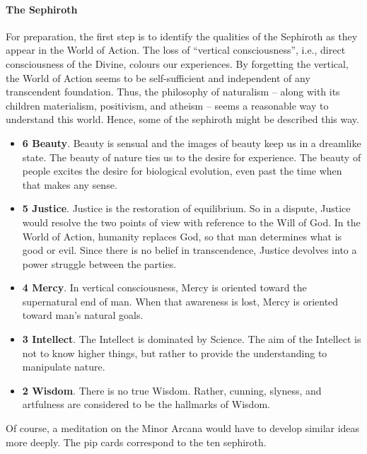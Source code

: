 \paragraph{The Sephiroth}


For preparation, the first step is to identify the qualities of the Sephiroth as they appear in the World of Action. The loss of ``vertical consciousness'', i.e., direct consciousness of the Divine, colours our experiences. By forgetting the vertical, the World of Action seems to be self-sufficient and independent of any transcendent foundation. Thus, the philosophy of naturalism -- along with its children materialism, positivism, and atheism -- seems a reasonable way to understand this world. Hence, some of the sephiroth might be described this way.

\begin{itemize}


\item \textbf{6 Beauty}. Beauty is sensual and the images of beauty keep us in a dreamlike state. The beauty of nature ties us to the desire for experience. The beauty of people excites the desire for biological evolution, even past the time when that makes any sense.

\item \textbf{5 Justice}. Justice is the restoration of equilibrium. So in a dispute, Justice would resolve the two points of view with reference to the Will of God. In the World of Action, humanity replaces God, so that man determines what is good or evil. Since there is no belief in transcendence, Justice devolves into a power struggle between the parties.

\item \textbf{4 Mercy}. In vertical consciousness, Mercy is oriented toward the supernatural end of man. When that awareness is lost, Mercy is oriented toward man's natural goals.

\item \textbf{3 Intellect}. The Intellect is dominated by Science. The aim of the Intellect is not to know higher things, but rather to provide the understanding to manipulate nature.

\item \textbf{2 Wisdom}. There is no true Wisdom. Rather, cunning, slyness, and artfulness are considered to be the hallmarks of Wisdom.
\end{itemize}


Of course, a meditation on the Minor Arcana would have to develop similar ideas more deeply. The pip cards correspond to the ten sephiroth.

